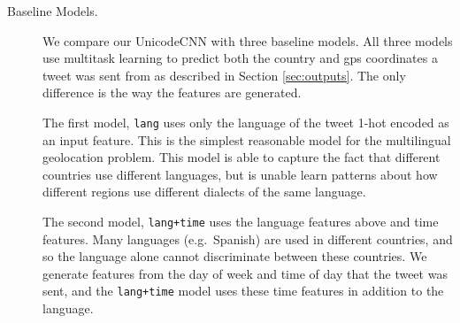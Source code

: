 \documentclass[sigconf,anonymous,review]{acmart}
\newcommand{\str}[1]{\texttt{#1}}
\newcommand{\ignore}[1]{}
\newcommand{\fixme}[1]{\textcolor{red}{\textbf{FIXME:} {#1}}}
\begin{document}
\begin{description}

\ignore{
\begin{figure}

    \vspace{-0.1in}
    \hspace{0.5in}
    \resizebox{0.45\textwidth}{!}{}
    \hspace{-0.5in}
    \vspace{-0.25in}

    \textbf{
    \caption{
        Language distribution of tweets in our dataset.
        Most tweets are not written in English,
        but prior work focuses on this special case.
        (*) Twitter classifies approximately 8\% of tweets in our dataset as having an unknown language.
        This may be because the tweet is written in a language that Twitter does not officially support,
        or because the tweet has too little text.
    \label{fig:lang}
    }
    }
\end{figure}
}

\item[Baseline Models.]

We compare our UnicodeCNN with three baseline models.
All three models use multitask learning to predict both the country and gps coordinates a tweet was sent from as described in Section \ref{sec:outputs}.
The only difference is the way the features are generated.

The first model, \str{lang} uses only the language of the tweet 1-hot encoded as an input feature.
This is the simplest reasonable model for the multilingual geolocation problem.
This model is able to capture the fact that different countries use different languages,
but is unable learn patterns about how different regions use different dialects of the same language. 

The second model, \str{lang+time} uses the language features above and time features.
Many languages (e.g.\ Spanish) are used in different countries,
and so the language alone cannot discriminate between these countries.
We generate features from the day of week and time of day that the tweet was sent,
and the \str{lang+time} model uses these time features in addition to the language.


\end{description}
\end{document}
